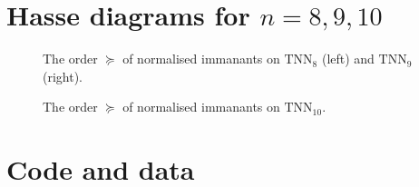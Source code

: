 \documentclass[11pt]{amsart}
\theoremstyle{definition}
\theoremstyle{remark}
\newcommand{\TNN}{\mathrm{TNN}}
\begin{document}
\clearpage
\appendix

\section{Hasse diagrams for \texorpdfstring{$n=8,9,10$}{n=8,9,10}}\label{app:hasse}
\raggedbottom

\begin{figure}[!h]
\centering
\resizebox{0.44\textwidth}{!}{}\hfill
\resizebox{!}{0.78\textheight}{}
\caption{The order $\succeq$ of normalised immanants on $\TNN_8$ (left) and $\TNN_9$ (right).}\label{fig:hasse89}
\end{figure}

\begin{figure}[!ht]
\centering
\resizebox{!}{0.8\textheight}{}
\caption{The order $\succeq$ of normalised immanants on $\TNN_{10}$.}\label{fig:hasse10}
\end{figure}

\clearpage

\section{Code and data}\label{app:data}
\end{document}

